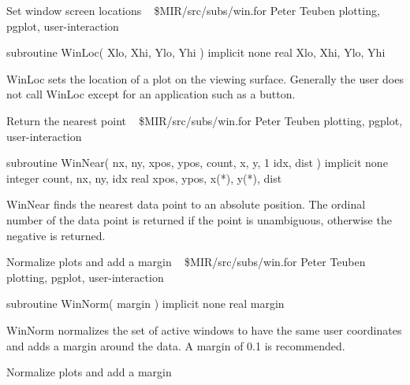 \noindent Set window screen locations
\newline \ 
\newline {} \$MIR/src/subs/win.for
\newline {} Peter Teuben
\newline {} plotting, pgplot, user-interaction
\par{\tenpoint
{\eightpoint\begintt
        subroutine WinLoc( Xlo, Xhi, Ylo, Yhi )
        implicit none
        real Xlo, Xhi, Ylo, Yhi

    WinLoc sets the location of a plot on the viewing surface.  Generally
    the user does not call WinLoc except for an application such as a
    button.
\endtt}
\par}
%
\noindent Return the nearest point
\newline \ 
\newline {} \$MIR/src/subs/win.for
\newline {} Peter Teuben
\newline \abox{Keywords:} plotting, pgplot, user-interaction
\par{\tenpoint
{\eightpoint\begintt
        subroutine WinNear( nx, ny, xpos, ypos, count, x, y, 
     1                      idx, dist )
        implicit none
        integer count, nx, ny, idx
        real xpos, ypos, x(*), y(*), dist

    WinNear finds the nearest data point to an absolute position.
    The ordinal number of the data point is returned if the point is
    unambiguous, otherwise the negative is returned.
\endtt}
\par}
%
\noindent Normalize plots and add a margin
\newline \ 
\newline {} \$MIR/src/subs/win.for
\newline \abox{Responsible:} Peter Teuben
\newline {} plotting, pgplot, user-interaction
\par{\tenpoint
{\eightpoint\begintt
        subroutine WinNorm( margin )
        implicit none
        real margin

    WinNorm normalizes the set of active windows to have the same user
    coordinates and adds a margin around the data.  A margin of 0.1 is
    recommended.
\endtt}
\par}
%
\noindent Normalize plots and add a margin
\newline \ 
